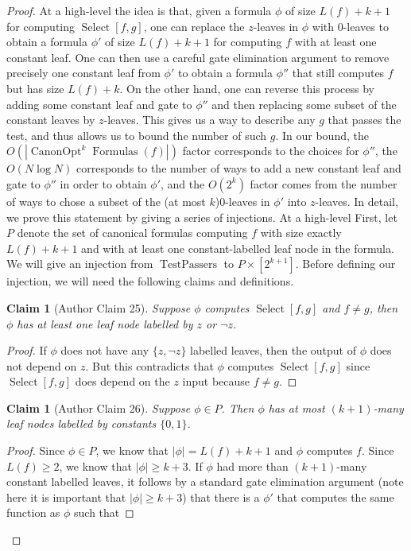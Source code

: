 \documentclass[10pt,a4paper]{article}
\newtheorem{ntclaim}[nttheorem]{Claim}
\newcommand{\Canon}[1]{\operatorname{CanonOpt}^{#1}\!\operatorname{Formulas}}
\newcommand{\Select}{\operatorname{Select}}
\begin{document}
\begin{proof}
At a high-level the idea is that, given a formula $\phi$ of size $L(f)+k+1$ for computing $\Select[f,g]$, one can replace the $z$-leaves in $\phi$ with 0-leaves to obtain a formula $\phi'$ of size $L(f)+k+1$ for computing $f$ with at least one constant leaf. One can then use a careful gate elimination argument to remove precisely one constant leaf from $\phi'$ to obtain a formula $\phi''$ that still computes $f$ but has size $L(f)+k$. On the other hand, one can reverse this process by adding some constant leaf and gate to $\phi''$ and then replacing some subset of the constant leaves by $z$-leaves.
This gives us a way to describe any $g$ that passes the test, and thus allows us to bound the number of such $g$. In our bound, the $O(|\Canon{k}(f)|)$ factor corresponds to the choices for $\phi''$, the $O(N\log N)$ corresponds to the number of ways to add a new constant leaf and gate to $\phi''$ in order to obtain $\phi'$, and the $O(2^k)$ factor comes from the number of ways to chose a subset of the (at most $k$)0-leaves in $\phi'$ into $z$-leaves.
In detail, we prove this statement by giving a series of injections. At a high-level First, let $P$ denote the set of canonical formulas computing $f$ with size exactly $L(f)+k+1$ and with at least one constant-labelled leaf node in the formula.
We will give an injection from $\operatorname{TestPassers}$ to $P\times[2^{k+1}]$. Before defining our injection, we will need the following claims and definitions.
\begin{ntclaim}[Author Claim 25]
Suppose $\phi$ computes $\Select[f,g]$ and $f\ne g$, then $\phi$ has at least one leaf node labelled by $z$ or $\neg z$.
\end{ntclaim}
\begin{proof}
If $\phi$ does not have any $\{z,\neg z\}$ labelled leaves, then the output of $\phi$ does not depend on $z$. But this contradicts that $\phi$ computes $\Select[f,g]$ since $\Select[f,g]$ does depend on the $z$ input because $f\ne g$.
\end{proof}
\begin{ntclaim}[Author Claim 26]
Suppose $\phi\in P$. Then $\phi$ has at most $(k+1)$-many leaf nodes labelled by constants $\{0,1\}$.
\end{ntclaim}
\begin{proof}
Since $\phi\in P$, we know that $|\phi|=L(f)+k+1$ and $\phi$ computes $f$. Since $L(f)\geq 2$, we know that $|\phi|\geq k+3$.
If $\phi$ had more than $(k+1)$-many constant labelled leaves, it follows by a standard gate elimination argument (note here it is important that $|\phi|\geq k+3$) that there is a $\phi'$ that computes the same function as $\phi$ such that

\end{proof}
\end{proof}
\end{document}
